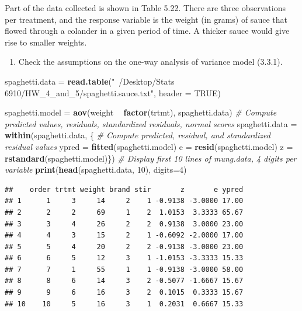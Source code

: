\documentclass[12pt,]{article}
\newenvironment{Shaded}{\begin{snugshade}}{\end{snugshade}}
\newcommand{\KeywordTok}[1]{\textcolor[rgb]{0.13,0.29,0.53}{\textbf{#1}}}
\newcommand{\DataTypeTok}[1]{\textcolor[rgb]{0.13,0.29,0.53}{#1}}
\newcommand{\DecValTok}[1]{\textcolor[rgb]{0.00,0.00,0.81}{#1}}
\newcommand{\StringTok}[1]{\textcolor[rgb]{0.31,0.60,0.02}{#1}}
\newcommand{\CommentTok}[1]{\textcolor[rgb]{0.56,0.35,0.01}{\textit{#1}}}
\newcommand{\OtherTok}[1]{\textcolor[rgb]{0.56,0.35,0.01}{#1}}
\newcommand{\OperatorTok}[1]{\textcolor[rgb]{0.81,0.36,0.00}{\textbf{#1}}}
\newcommand{\NormalTok}[1]{#1}
\providecommand{\tightlist}{%
  \setlength{\itemsep}{0pt}\setlength{\parskip}{0pt}}
\begin{document}
Part of the data collected is shown in Table 5.22. There are three
observations per treatment, and the response variable is the weight (in
grams) of sauce that flowed through a colander in a given period of
time. A thicker sauce would give rise to smaller weights.

\begin{enumerate}
\def\labelenumi{(\alph{enumi})}
\tightlist
\item
  Check the assumptions on the one-way analysis of variance model
  (3.3.1).
\end{enumerate}

\begin{Shaded}
\begin{Highlighting}[]
\NormalTok{spaghetti.data =}\StringTok{ }\KeywordTok{read.table}\NormalTok{(}\StringTok{"~/Desktop/Stats 6910/HW_4_and_5/spaghetti.sauce.txt"}\NormalTok{, }\DataTypeTok{header =} \OtherTok{TRUE}\NormalTok{)}

\NormalTok{spaghetti.model =}\StringTok{ }\KeywordTok{aov}\NormalTok{(weight }\OperatorTok{~}\StringTok{ }\KeywordTok{factor}\NormalTok{(trtmt), spaghetti.data)}
\CommentTok{# Compute predicted values, residuals, standardized residuals, normal scores}
\NormalTok{spaghetti.data =}\StringTok{ }\KeywordTok{within}\NormalTok{(spaghetti.data, \{}
  \CommentTok{# Compute predicted, residual, and standardized residual values}
\NormalTok{  ypred =}\StringTok{ }\KeywordTok{fitted}\NormalTok{(spaghetti.model)}
\NormalTok{  e =}\StringTok{ }\KeywordTok{resid}\NormalTok{(spaghetti.model) }
\NormalTok{  z =}\StringTok{ }\KeywordTok{rstandard}\NormalTok{(spaghetti.model)\})}
\CommentTok{# Display first 10 lines of mung.data, 4 digits per variable}
\KeywordTok{print}\NormalTok{(}\KeywordTok{head}\NormalTok{(spaghetti.data, }\DecValTok{10}\NormalTok{), }\DataTypeTok{digits=}\DecValTok{4}\NormalTok{)}
\end{Highlighting}
\end{Shaded}

\begin{verbatim}
##    order trtmt weight brand stir       z       e ypred
## 1      1     3     14     2    1 -0.9138 -3.0000 17.00
## 2      2     2     69     1    2  1.0153  3.3333 65.67
## 3      3     4     26     2    2  0.9138  3.0000 23.00
## 4      4     3     15     2    1 -0.6092 -2.0000 17.00
## 5      5     4     20     2    2 -0.9138 -3.0000 23.00
## 6      6     5     12     3    1 -1.0153 -3.3333 15.33
## 7      7     1     55     1    1 -0.9138 -3.0000 58.00
## 8      8     6     14     3    2 -0.5077 -1.6667 15.67
## 9      9     6     16     3    2  0.1015  0.3333 15.67
## 10    10     5     16     3    1  0.2031  0.6667 15.33
\end{verbatim}
\end{document}
